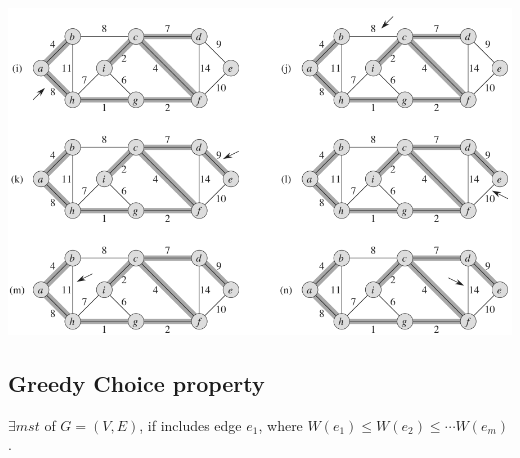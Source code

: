\documentclass[a4paper]{article}
\begin{document}
\includegraphics[width=\textwidth]{Kruskal2}
\subsection*{Greedy Choice property}
$\exists{mst}$ of $G=(V,E)$, if includes edge $e_1$, where $W(e_1)\leq W(e_2)\leq \cdots W(e_m)$.
\end{document}
